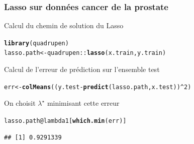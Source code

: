 \documentclass{beamer}\usepackage[]{graphicx}\usepackage[]{color}
\makeatletter
\newcommand{\hlnum}[1]{\textcolor[rgb]{0.686,0.059,0.569}{#1}}%
\newcommand{\hlopt}[1]{\textcolor[rgb]{0,0,0}{#1}}%
\newcommand{\hlstd}[1]{\textcolor[rgb]{0.345,0.345,0.345}{#1}}%
\newcommand{\hlkwb}[1]{\textcolor[rgb]{0.69,0.353,0.396}{#1}}%
\newcommand{\hlkwc}[1]{\textcolor[rgb]{0.333,0.667,0.333}{#1}}%
\newcommand{\hlkwd}[1]{\textcolor[rgb]{0.737,0.353,0.396}{\textbf{#1}}}%
\newenvironment{kframe}{%
 \def\at@end@of@kframe{}%
 \ifinner\ifhmode%
  \def\at@end@of@kframe{\end{minipage}}%
  \begin{minipage}{\columnwidth}%
 \fi\fi%
 \def\FrameCommand##1{\hskip\@totalleftmargin \hskip-\fboxsep
 \colorbox{shadecolor}{##1}\hskip-\fboxsep
     \hskip-\linewidth \hskip-\@totalleftmargin \hskip\columnwidth}%
 \MakeFramed {\advance\hsize-\width
   \@totalleftmargin\z@ \linewidth\hsize
   \@setminipage}}%
 {\par\unskip\endMakeFramed%
 \at@end@of@kframe}
\newenvironment{knitrout}{}{} %
\makeatother
\begin{document}
\begin{frame}
  \frametitle{Lasso sur données  cancer de la prostate}

  \vfill
Calcul du chemin de solution du Lasso

\begin{knitrout}\scriptsize
{}\color{fgcolor}\begin{kframe}
\begin{alltt}
\hlkwd{library}\hlstd{(quadrupen)}
\hlstd{lasso.path} \hlkwb{<-} \hlstd{quadrupen}\hlopt{::}\hlkwd{lasso}\hlstd{(x.train,y.train)}
\end{alltt}
\end{kframe}
\end{knitrout}

\vfill

Calcul de l'erreur de prédiction sur l'ensemble test
\begin{knitrout}\scriptsize
{}\color{fgcolor}\begin{kframe}
\begin{alltt}
\hlstd{err} \hlkwb{<-} \hlkwd{colMeans}\hlstd{((y.test}\hlopt{-}\hlkwd{predict}\hlstd{(lasso.path,x.test))}\hlopt{^}\hlnum{2}\hlstd{)}
\end{alltt}
\end{kframe}
\end{knitrout}

\vfill

On choisit $\lambda^\star$ minimisant cette erreur
\begin{knitrout}\scriptsize
{}\color{fgcolor}\begin{kframe}
\begin{alltt}
\hlstd{lasso.path}\hlopt{@}\hlkwc{lambda1}\hlstd{[}\hlkwd{which.min}\hlstd{(err)]}
\end{alltt}
\begin{verbatim}
## [1] 0.9291339
\end{verbatim}
\end{kframe}
\end{knitrout}

\framebreak


\end{frame}
\end{document}
